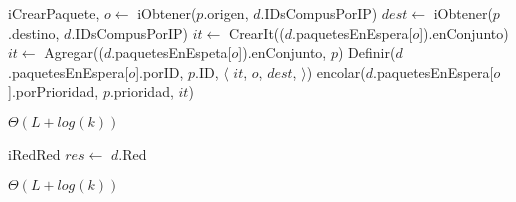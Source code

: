 \begin{Algoritmos}
  \begin{algoritmo}{iCrearPaquete}{,}{}
     $o \gets$ iObtener($p$.origen, $d$.IDsCompusPorIP)
     $dest \gets$ iObtener($p$.destino, $d$.IDsCompusPorIP)
    $it \gets$ CrearIt(($d$.paquetesEnEspera[$o$]).enConjunto)
    $it \gets$ Agregar(($d$.paquetesEnEspeta[$o$]).enConjunto, $p$)
    Definir($d$.paquetesEnEspera[$o$].porID, $p$.ID, $\langle$ $it$, $o$, $dest$, $\rangle$)
    encolar($d$.paquetesEnEspera[$o$].porPrioridad, $p$.prioridad, $it$)
  \end{algoritmo}
  \datosAlgoritmo{} %
  {} %
  {} %
  {$\Theta(L+log(k))$} %
  {} %

  \begin{algoritmo}{iRed}{}{Red}
    $res \gets$ $d$.Red 
  \end{algoritmo}
  \datosAlgoritmo{} %
  {} %
  {} %
  {$\Theta(L+log(k))$} %
  {} %


\end{Algoritmos}
